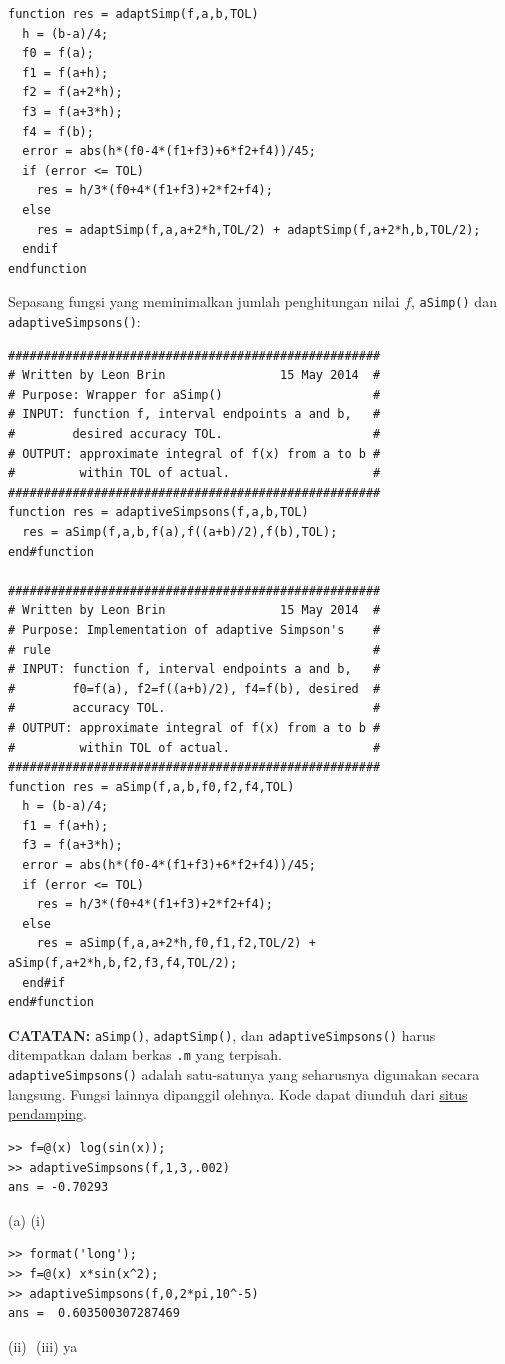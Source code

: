 \begin{description}
\begin{verbatim}
function res = adaptSimp(f,a,b,TOL)
  h = (b-a)/4;
  f0 = f(a);
  f1 = f(a+h);
  f2 = f(a+2*h);
  f3 = f(a+3*h);
  f4 = f(b);
  error = abs(h*(f0-4*(f1+f3)+6*f2+f4))/45;
  if (error <= TOL)
    res = h/3*(f0+4*(f1+f3)+2*f2+f4);
  else
    res = adaptSimp(f,a,a+2*h,TOL/2) + adaptSimp(f,a+2*h,b,TOL/2);
  endif
endfunction
\end{verbatim}

Sepasang fungsi yang meminimalkan jumlah penghitungan nilai $f$,
\texttt{aSimp()} dan \texttt{adaptiveSimpsons()}:\begin{verbatim}
####################################################
# Written by Leon Brin                15 May 2014  #
# Purpose: Wrapper for aSimp()                     #
# INPUT: function f, interval endpoints a and b,   #
#        desired accuracy TOL.                     #
# OUTPUT: approximate integral of f(x) from a to b #
#         within TOL of actual.                    #
####################################################
function res = adaptiveSimpsons(f,a,b,TOL)
  res = aSimp(f,a,b,f(a),f((a+b)/2),f(b),TOL);
end#function

####################################################
# Written by Leon Brin                15 May 2014  #
# Purpose: Implementation of adaptive Simpson's    #
# rule                                             #
# INPUT: function f, interval endpoints a and b,   #
#        f0=f(a), f2=f((a+b)/2), f4=f(b), desired  #
#        accuracy TOL.                             #
# OUTPUT: approximate integral of f(x) from a to b #
#         within TOL of actual.                    #
####################################################
function res = aSimp(f,a,b,f0,f2,f4,TOL)
  h = (b-a)/4;
  f1 = f(a+h);
  f3 = f(a+3*h);
  error = abs(h*(f0-4*(f1+f3)+6*f2+f4))/45;
  if (error <= TOL)
    res = h/3*(f0+4*(f1+f3)+2*f2+f4);
  else
    res = aSimp(f,a,a+2*h,f0,f1,f2,TOL/2) + aSimp(f,a+2*h,b,f2,f3,f4,TOL/2);
  end#if
end#function
\end{verbatim}

\textbf{CATATAN:} \texttt{aSimp()}, \texttt{adaptSimp()}, dan \texttt{adaptiveSimpsons()}
harus ditempatkan dalam berkas \texttt{.m} yang terpisah.\\
\texttt{adaptiveSimpsons()} adalah satu-satunya yang seharusnya digunakan
secara langsung. Fungsi lainnya dipanggil olehnya. Kode dapat diunduh
dari \href{http://lqbrin.github.io/tea-time-numerical/ancillaries.html}{situs pendamping}.
\item [{\ref{exc:calculus-composite-21}:}] \begin{verbatim}
>> f=@(x) log(sin(x));
>> adaptiveSimpsons(f,1,3,.002)
ans = -0.70293
\end{verbatim}
\item [{\ref{exc:calculus-composite-22}:}] (a) (i) \begin{verbatim}
>> format('long');
>> f=@(x) x*sin(x^2);
>> adaptiveSimpsons(f,0,2*pi,10^-5)
ans =  0.603500307287469
\end{verbatim}(ii) $ $ (iii) ya
\end{description}

